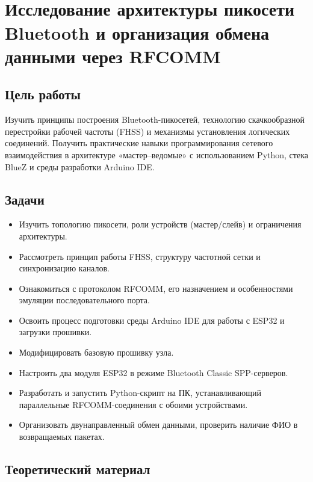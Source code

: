 \section[Исследование архитектуры пикосети Bluetooth и организация обмена данными через RFCOMM]
{\\ Исследование архитектуры пикосети Bluetooth и организация обмена \\данными через RFCOMM}

\subsection{Цель работы}
Изучить принципы построения Bluetooth-пикосетей, технологию скачкообразной перестройки рабочей частоты (FHSS) и механизмы установления логических соединений. Получить практические навыки программирования сетевого взаимодействия в архитектуре «мастер–ведомые» с использованием Python, стека BlueZ и среды разработки Arduino IDE.

\subsection{Задачи}
\begin{itemize}[nosep]
    \item Изучить топологию пикосети, роли устройств (мастер/слейв) и ограничения архитектуры.
    \item Рассмотреть принцип работы FHSS, структуру частотной сетки и синхронизацию каналов.
    \item Ознакомиться с протоколом RFCOMM, его назначением и особенностями эмуляции последовательного порта.
    \item Освоить процесс подготовки среды Arduino IDE для работы с ESP32 и загрузки прошивки.
    \item Модифицировать базовую прошивку узла.
    \item Настроить два модуля ESP32 в режиме Bluetooth Classic SPP-серверов.
    \item Разработать и запустить Python-скрипт на ПК, устанавливающий параллельные RFCOMM-соединения с обоими устройствами.
    \item Организовать двунаправленный обмен данными, проверить наличие ФИО в возвращаемых пакетах.
\end{itemize}

\subsection{Теоретический материал}

